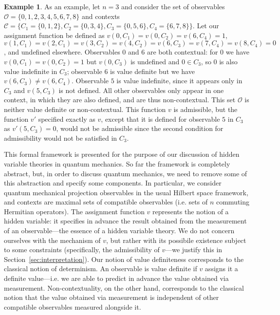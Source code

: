 \documentclass[11pt, a4paper]{article}
\theoremstyle{definition}
\newtheorem{Example}[Theorem]{Example}
\begin{document}
\begin{Example}
	As an example, let $n=3$ and consider the set of observables $\mathcal{O}=\{0,1,2,3,4,5,6,7,8\}$ and contexts $\mathcal{C}=\{C_1=\{0,1,2\},C_2=\{0,3,4\},C_3=\{0,5,6\},C_4=\{6,7,8\}\}$.
	Let our assignment function be defined as $v(0,C_1)=v(0,C_2)=v(6,C_4)=1$, $v(1,C_1)=v(2,C_1)=v(3,C_2)=v(4,C_2)=v(6,C_3)=v(7,C_4)=v(8,C_4)=0$, and undefined elsewhere.
	Observables 0 and 6 are both contextual: for 0 we have $v(0,C_1)=v(0,C_2)=1$ but $v(0,C_3)$ is undefined and $0\in C_3$, so 0 is also value indefinite in $C_3$; observable 6 is value definite but we have $v(6,C_3)\neq v(6,C_4)$.
	Observable $5$ is value indefinite, since it appears only in $C_3$ and $v(5,C_3)$ is not defined.
	All other observables only appear in one context, in which they are also defined, and are thus non-contextual.
	This set $\mathcal{O}$ is neither value definite or non-contextual.
	This function $v$ is admissible, but the function $v'$ specified exactly as $v$, except that it is defined for observable $5$ in $C_3$ as $v'(5,C_3)=0$, would not be admissible since the second condition for admissibility would not be satisfied in $C_3$.
\end{Example}
	
This formal framework is presented for the purpose of our discussion of hidden variable theories in quantum mechanics.
So far the framework is completely abstract, but, in order to discuss quantum mechanics, we need to remove some of this abstraction and specify some components. %
In particular, we consider quantum mechanical projection observables in the usual Hilbert space framework, and contexts are maximal sets of compatible observables (i.e. sets of $n$ commuting Hermitian operators).
The assignment function $v$ represents the notion of a hidden variable: it specifies in advance the result obtained from the measurement of an observable---the essence of a hidden variable theory. We do not concern ourselves with the mechanism of $v$, but rather with its possibile existence subject to some constraints (specifically, the admissibility of $v$---we justify this in Section~\ref{sec:interpretation}).
Our notion of value definiteness corresponds to the classical notion of determinism. An observable is value definite if $v$ assigns it a definite value---i.e. we are able to predict in advance the value obtained via measurement.
Non-contextuality, on the other hand, corresponds to the classical notion that the value obtained via measurement is independent of other compatible observables measured alongside it.
\end{document}
